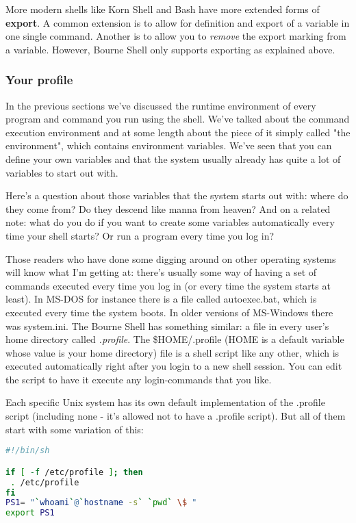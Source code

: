More modern shells like Korn Shell and Bash have more extended forms of
\textbf{export}. A common extension is to allow for definition and export of a
variable in one single command. Another is to allow you to \textit{remove} the
export marking from a variable. However, Bourne Shell only supports exporting
as explained above.

\subsubsection{Your profile} In the previous sections we've discussed the
runtime environment of every program and command you run using the shell. We've
talked about the command execution environment and at some length about the
piece of it simply called "the environment", which contains environment
variables. We've seen that you can define your own variables and that the
system usually already has quite a lot of variables to start out with.

Here's a question about those variables that the system starts out with: where
do they come from? Do they descend like manna from heaven? And on a related
note: what do you do if you want to create some variables automatically every
time your shell starts? Or run a program every time you log in?

Those readers who have done some digging around on other operating systems will
know what I'm getting at: there's usually some way of having a set of commands
executed every time you log in (or every time the system starts at least). In
MS-DOS for instance there is a file called autoexec.bat, which is executed
every time the system boots. In older versions of MS-Windows there was
system.ini. The Bourne Shell has something similar: a file in every user's home
directory called \textit{.profile}. The \$HOME/.profile (HOME is a default
variable whose value is your home directory) file is a shell script like any
other, which is executed automatically right after you login to a new shell
session. You can edit the script to have it execute any login-commands that you
like.

Each specific Unix system has its own default implementation of the .profile
script (including none - it's allowed not to have a .profile script). But all
of them start with some variation of this:
\lstset{basicstyle=\scriptsize, numbers=left, captionpos=b, tabsize=4}
\begin{lstlisting}[caption=A basic (but typical) HOME profile,language={bash},
xleftmargin=15pt,label=lst:A basic (but typical) HOME profile]
#!/bin/sh

if [ -f /etc/profile ]; then
 . /etc/profile
fi
PS1= "`whoami`@`hostname -s` `pwd` \$ "
export PS1
\end{lstlisting}

